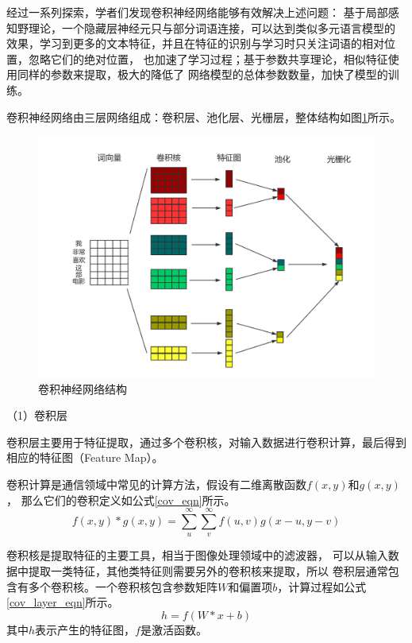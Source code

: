 经过一系列探索，学者们发现卷积神经网络能够有效解决上述问题：
基于局部感知野理论，一个隐藏层神经元只与部分词语连接，可以达到类似多元语言模型的
效果，学习到更多的文本特征，并且在特征的识别与学习时只关注词语的相对位置，忽略它们的绝对位置，
也加速了学习过程；基于参数共享理论，相似特征使用同样的参数来提取，极大的降低了
网络模型的总体参数数量，加快了模型的训练。



卷积神经网络由三层网络组成：卷积层、池化层、光栅层，整体结构如图\ref{Text_CNN}所示。
\begin{figure}[h]
    \includegraphics[scale=0.4]{picture/Text_CNN.png}
    \caption{卷积神经网络结构}
    \label{Text_CNN}
\end{figure}

（1）卷积层

卷积层主要用于特征提取，通过多个卷积核，对输入数据进行卷积计算，最后得到相应的特征图（Feature Map）。

卷积计算是通信领域中常见的计算方法，假设有二维离散函数$f\left ( x,y \right )$和$g\left ( x,y \right )$，
那么它们的卷积定义如公式\ref{cov_eqn}所示。
\begin{equation}
    f\left ( x,y \right )\ast g\left ( x,y \right )=\sum_{u}^{\infty }\sum_{v}^{\infty }f\left ( u,v \right )
g\left ( x-u,y-v \right )
    \label{cov_eqn}
\end{equation}

卷积核是提取特征的主要工具，相当于图像处理领域中的滤波器，
可以从输入数据中提取一类特征，其他类特征则需要另外的卷积核来提取，所以
卷积层通常包含有多个卷积核。一个卷积核包含参数矩阵$W$和偏置项$b$，计算过程如公式\ref{cov_layer_eqn}所示。
\begin{equation}
    h=f\left ( W\ast x+b \right )
    \label{cov_layer_eqn}
\end{equation}
其中$h$表示产生的特征图，$f$是激活函数。

